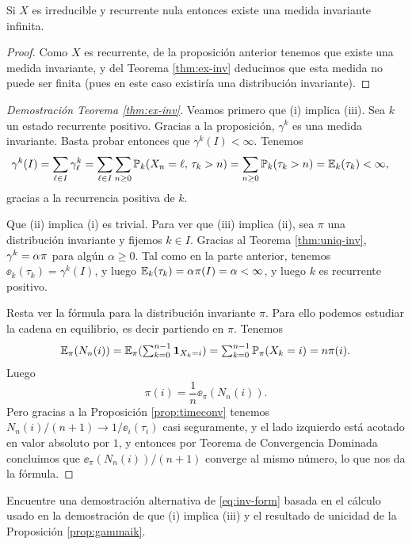 \begin{cor}\label{cor:recnul}
Si $X$ es irreducible y recurrente nula entonces existe una medida invariante infinita.
\end{cor}

\begin{proof}
Como $X$ es recurrente, de la proposición anterior tenemos que existe una medida invariante, y del Teorema \ref{thm:ex-inv} deducimos que esta medida no puede ser finita (pues en este caso existiría una distribución invariante).
\end{proof}

\begin{proof}[Demostración Teorema \ref{thm:ex-inv}]
Veamos primero que (i) implica (iii).
Sea $k$ un estado recurrente positivo.
Gracias a la proposición, $\gamma^k$ es una medida invariante.
Basta probar entonces que $\gamma^k(I)<\infty$.
Tenemos
\begin{align}
\gamma^k(I)&=\sum_{\ell\in I}\gamma^k_\ell=\sum_{\ell\in I}\sum_{n\geq0}\mathbb{P}_k(X_n=\ell,\,\tau_k>n)=\sum_{n\geq0}\mathbb{P}_k(\tau_k>n)=\mathbb{E}_k(\tau_k)<\infty,
\end{align}
gracias a la recurrencia positiva de $k$.

Que (ii) implica (i) es trivial.
Para ver que (iii) implica (ii), sea $\pi$ una distribución invariante y fijemos $k\in I$.
Gracias al Teorema \ref{thm:uniq-inv}, $\gamma^k=\alpha\hspace{0.05em}\pi$ para algún $\alpha\geq0$.
Tal como en la parte anterior, tenemos $\ee_k(\tau_k)=\gamma^k(I)$, y luego $\mathbb{E}_k(\tau_k)=\alpha\hspace{0.05em}\pi(I)=\alpha<\infty$, y luego $k$ es recurrente positivo.

Resta ver la fórmula para la distribución invariante $\pi$.
Para ello podemos estudiar la cadena en equilibrio, es decir partiendo en $\pi$.
Tenemos
\[\textstyle\mathbb{E}_\pi(N_n(i))=\mathbb{E}_\pi(\sum_{k=0}^{n-1}\mathbf{1}_{X_k=i})=\sum_{k=0}^{n-1}\mathbb{P}_\pi(X_k=i)=n\pi(i).\]
Luego 
\[\pi(i)=\frac1{n}\ee_\pi(N_n(i)).\]
Pero gracias a la Proposición \ref{prop:timeconv} tenemos $N_n(i)/(n+1)\longrightarrow1/\ee_i(\tau_i)$ casi seguramente, y el lado izquierdo está acotado en valor absoluto por $1$, y entonces por Teorema de Convergencia Dominada concluimos que $\ee_\pi(N_n(i))/(n+1)$ converge al mismo número, lo que nos da la fórmula.
\end{proof}

\begin{exer}\label{exer:inv-form-alt} 
Encuentre una demostración alternativa de \eqref{eq:inv-form} basada en el cálculo usado en la demostración de que (i) implica (iii) y el resultado de unicidad de la Proposición \ref{prop:gammaik}.
\end{exer}

